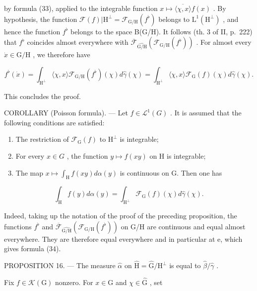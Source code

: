 by formula (33), applied to the integrable function \(x \mapsto \overline{\langle\chi, x\rangle} f(x)\) . By hypothesis, the function \(\mathcal{F}(f)|\mathrm{H}^{\perp} = \mathcal{F}_{\mathrm{G}/\mathrm{H}}(f^{\flat})\) belongs to \(\mathrm{L}^{1}(\mathrm{H}^{\perp})\) , and hence the function \(f^{\flat}\) belongs to the space B(G/H). It follows (th. 3 of II, p.~222) that \(f^{\flat}\) coincides almost everywhere with \(\overline{\mathcal{F}}_{\widehat{\mathrm{G / H}}}(\mathcal{F}_{\mathrm{G / H}}(f^{\flat}))\) . For almost every \(\dot{x}\in \mathrm{G / H}\) , we therefore have

\[
f ^ {\flat} (\dot {x}) = \int_ {\mathrm{H} ^ {\perp}} \langle \chi , x \rangle \mathcal {F} _ {\mathrm{G/H}} (f ^ {\flat}) (\chi) d \widehat {\gamma} (\chi) = \int_ {\mathrm{H} ^ {\perp}} \langle \chi , x \rangle \mathcal {F} _ {\mathrm{G}} (f) (\chi) d \widehat {\gamma} (\chi).
\]

This concludes the proof.

COROLLARY (Poisson formula). --- Let \(f \in \mathcal{L}^{1}(G)\) . It is assumed that the following conditions are satisfied:

\begin{enumerate}
\def\labelenumi{(\roman{enumi})}
\item
  The restriction of \(\mathcal{F}_{\mathrm{G}}(f)\) to \(\mathrm{H}^{\perp}\) is integrable;
\item
  For every \(x \in G\) , the function \(y \mapsto f(xy)\) on H is integrable;
\item
  The map \(x\mapsto \int_{\mathrm{H}}f(xy)d\alpha (y)\) is continuous on G. Then one has
\end{enumerate}

\[
\int_ {\mathrm{H}} f (y) d \alpha (y) = \int_ {\mathrm{H} ^ {\perp}} \mathcal {F} _ {\mathrm{G}} (f) (\chi) d \widehat {\gamma} (\chi).\tag{34}
\]

Indeed, taking up the notation of the proof of the preceding proposition, the functions \(f^{\flat}\) and \(\overline{\mathcal{F}}_{\widehat{\mathrm{G/H}}}\left(\mathcal{F}_{\mathrm{G/H}}(f^{\flat})\right)\) on G/H are continuous and equal almost everywhere. They are therefore equal everywhere and in particular at e, which gives formula (34).

PROPOSITION 16. --- The measure \(\widehat{\alpha}\) on \(\widehat{\mathrm{H}} = \widehat{\mathrm{G}} / \mathrm{H}^{\perp}\) is equal to \(\widehat{\beta} / \widehat{\gamma}\) .

Fix \(f\in \mathcal{K}(\mathrm{G})\) nonzero. For \(x\in \mathrm{G}\) and \(\chi \in \widehat{\mathrm{G}}\) , set

